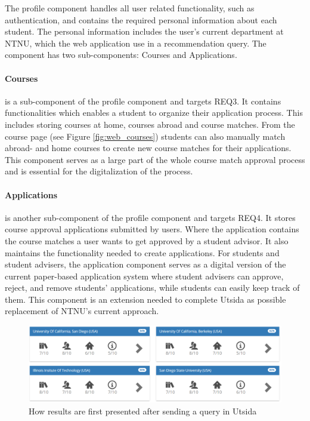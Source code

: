 The profile component handles all user related functionality, such as authentication, and contains the required personal information about each student. The personal information includes the user's current department at NTNU, which the web application use in a recommendation query. The component has two sub-components: Courses and Applications.

\paragraph{Courses} 
is a sub-component of the profile component and targets REQ3. It contains functionalities which enables a student to organize their application process. This includes storing courses at home, courses abroad and course matches. From the course page (see Figure \ref{fig:web_courses}) students can also manually match abroad- and home courses to create new course matches for their applications. This component serves as a large part of the whole course match approval process and is essential for the digitalization of the process.

\paragraph{Applications} 
is another sub-component of the profile component and targets REQ4. It stores course approval applications submitted by users. Where the application contains the course matches a user wants to get approved by a student advisor. It also maintains the functionality needed to create applications. For students and student advisers, the application component serves as a digital version of the current paper-based application system where student advisers can approve, reject, and remove students' applications, while students can easily keep track of them. This component is an extension needed to complete Utsida as possible replacement of NTNU's current approach.

\begin{figure}[h]
    \centering
    \includegraphics[width=1\textwidth]{fig/utsida_screenshots/results_1_cut.png}
    \caption{How results are first presented after sending a query in Utsida}
    \label{fig:web_results_1}
\end{figure}

